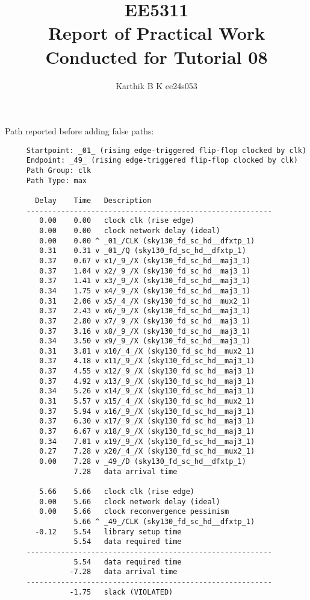 \documentclass[12pt,a4paper]{article}
\begin{document}
\title{EE5311 \\ Report of Practical Work Conducted for Tutorial 08}
\author{Karthik B K ee24s053}
\maketitle

Path reported before adding false paths:

\begin{verbatim}
     Startpoint: _01_ (rising edge-triggered flip-flop clocked by clk)
     Endpoint: _49_ (rising edge-triggered flip-flop clocked by clk)
     Path Group: clk
     Path Type: max
     
       Delay    Time   Description
     ---------------------------------------------------------
        0.00    0.00   clock clk (rise edge)
        0.00    0.00   clock network delay (ideal)
        0.00    0.00 ^ _01_/CLK (sky130_fd_sc_hd__dfxtp_1)
        0.31    0.31 v _01_/Q (sky130_fd_sc_hd__dfxtp_1)
        0.37    0.67 v x1/_9_/X (sky130_fd_sc_hd__maj3_1)
        0.37    1.04 v x2/_9_/X (sky130_fd_sc_hd__maj3_1)
        0.37    1.41 v x3/_9_/X (sky130_fd_sc_hd__maj3_1)
        0.34    1.75 v x4/_9_/X (sky130_fd_sc_hd__maj3_1)
        0.31    2.06 v x5/_4_/X (sky130_fd_sc_hd__mux2_1)
        0.37    2.43 v x6/_9_/X (sky130_fd_sc_hd__maj3_1)
        0.37    2.80 v x7/_9_/X (sky130_fd_sc_hd__maj3_1)
        0.37    3.16 v x8/_9_/X (sky130_fd_sc_hd__maj3_1)
        0.34    3.50 v x9/_9_/X (sky130_fd_sc_hd__maj3_1)
        0.31    3.81 v x10/_4_/X (sky130_fd_sc_hd__mux2_1)
        0.37    4.18 v x11/_9_/X (sky130_fd_sc_hd__maj3_1)
        0.37    4.55 v x12/_9_/X (sky130_fd_sc_hd__maj3_1)
        0.37    4.92 v x13/_9_/X (sky130_fd_sc_hd__maj3_1)
        0.34    5.26 v x14/_9_/X (sky130_fd_sc_hd__maj3_1)
        0.31    5.57 v x15/_4_/X (sky130_fd_sc_hd__mux2_1)
        0.37    5.94 v x16/_9_/X (sky130_fd_sc_hd__maj3_1)
        0.37    6.30 v x17/_9_/X (sky130_fd_sc_hd__maj3_1)
        0.37    6.67 v x18/_9_/X (sky130_fd_sc_hd__maj3_1)
        0.34    7.01 v x19/_9_/X (sky130_fd_sc_hd__maj3_1)
        0.27    7.28 v x20/_4_/X (sky130_fd_sc_hd__mux2_1)
        0.00    7.28 v _49_/D (sky130_fd_sc_hd__dfxtp_1)
                7.28   data arrival time
     
        5.66    5.66   clock clk (rise edge)
        0.00    5.66   clock network delay (ideal)
        0.00    5.66   clock reconvergence pessimism
                5.66 ^ _49_/CLK (sky130_fd_sc_hd__dfxtp_1)
       -0.12    5.54   library setup time
                5.54   data required time
     ---------------------------------------------------------
                5.54   data required time
               -7.28   data arrival time
     ---------------------------------------------------------
               -1.75   slack (VIOLATED)
\end{verbatim}
\end{document}
